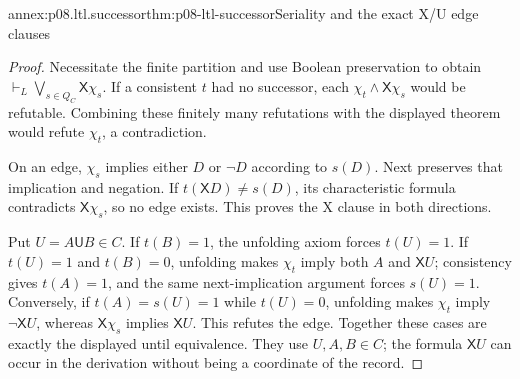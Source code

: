 \begin{annexitem}{annex:p08.ltl.successor}{thm:p08-ltl-successor}{Seriality and the exact X/U edge clauses}
\begin{proof}
Necessitate the finite partition and use Boolean preservation to
obtain \(\vdash_L\bigvee_{s\in Q_C}\mathsf X\chi_s\).
If a consistent \(t\) had no successor, each
\(\chi_t\land\mathsf X\chi_s\) would be refutable. Combining
these finitely many refutations with the displayed theorem would
refute \(\chi_t\), a contradiction.

On an edge, \(\chi_s\) implies either \(D\) or \(\neg D\)
according to \(s(D)\). Next preserves that implication and
negation. If \(t(\mathsf XD)\ne s(D)\), its characteristic
formula contradicts \(\mathsf X\chi_s\), so no edge exists.
This proves the X clause in both directions.

Put \(U=A\mathbin{\mathsf U}B\in C\). If \(t(B)=1\),
the unfolding axiom forces \(t(U)=1\). If \(t(U)=1\) and
\(t(B)=0\), unfolding makes \(\chi_t\) imply both \(A\)
and \(\mathsf XU\); consistency gives \(t(A)=1\), and the
same next-implication argument forces \(s(U)=1\).
Conversely, if \(t(A)=s(U)=1\) while \(t(U)=0\), unfolding
makes \(\chi_t\) imply \(\neg\mathsf XU\), whereas
\(\mathsf X\chi_s\) implies \(\mathsf XU\). This refutes
the edge. Together these cases are exactly the displayed until
equivalence. They use \(U,A,B\in C\); the formula
\(\mathsf XU\) can occur in the derivation without being a
coordinate of the record.
\end{proof}
\end{annexitem}

